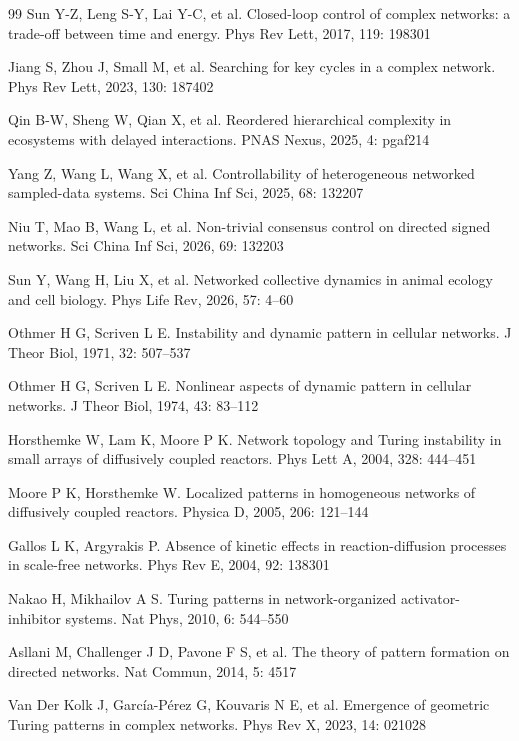 \documentclass{SCIS2026}
\begin{document}
\begin{thebibliography}{99}
	Sun Y-Z, Leng S-Y, Lai Y-C, et al. Closed-loop control of complex networks: a trade-off between time and energy. Phys Rev Lett, 2017, 119: 198301

	Jiang S, Zhou J, Small M, et al. Searching for key cycles in a complex network. Phys Rev Lett, 2023, 130: 187402

	Qin B-W, Sheng W, Qian X, et al. Reordered hierarchical complexity in ecosystems with delayed interactions. PNAS Nexus, 2025, 4: pgaf214

	Yang Z, Wang L, Wang X, et al. Controllability of heterogeneous networked sampled-data systems. Sci China Inf Sci, 2025, 68: 132207

	Niu T, Mao B, Wang L, et al. Non-trivial consensus control on directed signed networks. Sci China Inf Sci, 2026, 69: 132203

	Sun Y, Wang H, Liu X, et al. Networked collective dynamics in animal ecology and cell biology. Phys Life Rev, 2026, 57: 4--60

	Othmer H G, Scriven L E. Instability and dynamic pattern in cellular networks. J Theor Biol, 1971, 32: 507--537

	Othmer H G, Scriven L E. Nonlinear aspects of dynamic pattern in cellular networks. J Theor Biol, 1974, 43: 83--112

	Horsthemke W, Lam K, Moore P K. Network topology and Turing instability in small arrays of diffusively coupled reactors. Phys Lett A, 2004, 328: 444--451

	Moore P K, Horsthemke W. Localized patterns in homogeneous networks of diffusively coupled reactors. Physica D, 2005, 206: 121--144

	Gallos L K, Argyrakis P. Absence of kinetic effects in reaction-diffusion processes in scale-free networks. Phys Rev E, 2004, 92: 138301

	Nakao H, Mikhailov A S. Turing patterns in network-organized activator-inhibitor systems. Nat Phys, 2010, 6: 544--550

	Asllani M, Challenger J D, Pavone F S, et al. The theory of pattern formation on directed networks. Nat Commun, 2014, 5: 4517

	Van Der Kolk J, Garc\'ia-P\'erez G, Kouvaris N E, et al. Emergence of geometric Turing patterns in complex networks. Phys Rev X, 2023, 14: 021028


\end{thebibliography}
\end{document}
